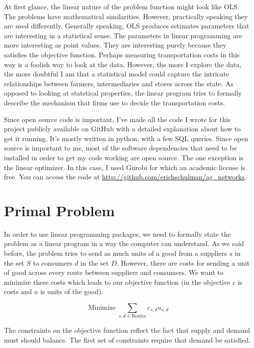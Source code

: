\documentclass{report}
\begin{document}
At first glance, the  linear nature of the problem function might look like OLS. The problems have mathematical similarities. However, practically speaking they are used differently. Generally speaking, OLS produces estimates parameters that are interesting in a statistical sense.  The parameters in linear programming are more interesting as point values. They are interesting purely because they satisfies the objective function. Perhaps measuring transportation costs in this way is a foolish way to look at the data. However, the more I explore the data, the more doubtful I am that a statistical model could capture the intricate relationships between farmers, intermediaries and stores across the state. As opposed to looking at statstical properties, the linear program tries to formally describe the mechanism that firms use to decide the transportation costs.

Since  open source code is important, I've made all the code I wrote for this project publicly available on GitHub with a detailed explanation about how to get it running. It's mostly written in python, with a few SQL queries. Since open source is important to me, most of the software dependencies that need to be installed in order to get my code working are open source. The one exception is the linear optimizer. In this case, I used Gurobi for which an academic license is free. You can access the code at \url{http://github.com/erichschulman/ag_networks}.

\section{Primal Problem}

In order to use linear programming packages, we need to formally state the problem as a linear program in a way the computer can understand. As we said before, the problem tries to send as much units of a good from a suppliers $s$ in the set $S$ to consumers $d$ in the set $D$. However, there are costs for sending a unit of good across every route between suppliers and consumers. We want to minimize these costs which leads to our objective function (in the objective $c$ is costs and $u$ is units of the good). 

$$\operatorname{Minimize} \sum_{s,d \in \text{Routes}} c_{s,d} u_{s,d}$$

The constraints on the objective function reflect the fact that supply and demand must should balance. The first set of constraints require that demand be satisfied.
\end{document}
